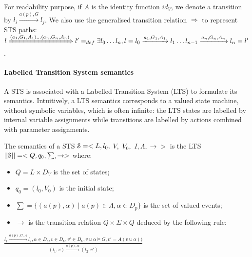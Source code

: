 For readability purpose, if $A$ is the identity function $id_V$,
we denote a transition by $l_i \xrightarrow{a(p),G} l_j$. We
also use the generalised transition relation $\Rightarrow$ to
represent STS paths: $l \xRightarrow{(a_1,G_1,A_1)\dots
(a_n,G_n,A_n)} l' =_{def} \exists l_0\dots l_n, l=l_0
\xrightarrow{a_1,G_1,A_1} l_1\dots
l_{n-1}\xrightarrow{a_n,G_n,A_n}l_n=l'$.

\paragraph{Labelled Transition System semantics}
\label{sec:definitions:lts-semantics}

A STS is associated with a Labelled Transition System (LTS) to
formulate its semantics. Intuitively, a LTS semantics corresponds
to a valued state machine, without symbolic variables, which is
often infinite: the LTS states are labelled by internal variable
assignments while transitions are labelled by actions combined
with parameter assignments.

\begin{definition}
    The semantics of a STS $\EuScript{S}=<L,l_0,$ $V,$ $V_0,$
    $I,\Lambda,\rightarrow>$ is the LTS
    $||\EuScript{S}||=<Q,q_0,\sum,\rightarrow>$ where:

	\begin{itemize}

		\item $Q=L \times D_V$ is the set of states;

        \item $q_0=(l_0,V_0)$ is the initial state;

		\item $\sum=\{(a(p),\alpha)  \mid  a(p)\in\Lambda, \alpha \in
		D_p\}$ is the set of valued events;

        \item $\rightarrow$ is the transition relation $Q \times
        \Sigma \times Q$ deduced by the following rule:\\
	\end{itemize}
	\begin{center}
    {\Large
    $\frac{l_1 \xrightarrow{a(p),G,A}l_2,\alpha \in D_p, v \in D_V, v'
        \in D_V, v \cup \alpha \models G, v'=A(v \cup \alpha))}{(l_1,v)
            \xrightarrow{a(p),\alpha} (l_2,v') }$
    }
	\end{center}

	\label{def:semantics}
\end{definition}

